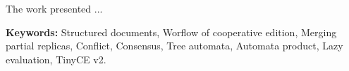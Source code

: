 The work presented ...

\vspace{1cm}
\noindent\textbf{Keywords:} Structured documents, Worflow of cooperative edition, Merging partial replicas, Conflict, Consensus, Tree automata, Automata product, Lazy evaluation, TinyCE v2.

\myCleanStarChapterEnd
